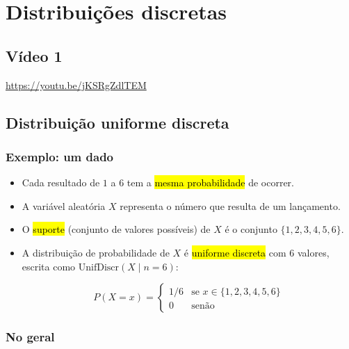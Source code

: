 \documentclass[
  11pt]{report}
\begin{document}
\hypertarget{discretas}{%
\chapter{Distribuições discretas}\label{discretas}}

\hypertarget{vuxeddeo-1-5}{%
\section{Vídeo 1}\label{vuxeddeo-1-5}}

\begin{center} \url{https://youtu.be/jKSRgZdlTEM} \end{center}

\hypertarget{distribuiuxe7uxe3o-uniforme-discreta}{%
\section{Distribuição uniforme discreta}\label{distribuiuxe7uxe3o-uniforme-discreta}}

\hypertarget{exemplo-um-dado}{%
\subsection{Exemplo: um dado}\label{exemplo-um-dado}}

\begin{itemize}
\item
  Cada resultado de $1$ a $6$ tem a {\hl{mesma probabilidade}} de ocorrer.
\item
  A variável aleatória $X$ representa o número que resulta de um lançamento.
\item
  O {\hl{suporte}} (conjunto de valores possíveis) de $X$ é o conjunto $\{ 1, 2, 3, 4, 5, 6 \}$.
\item
  A distribuição de probabilidade de $X$ é {\hl{uniforme discreta}} com $6$ valores, escrita como $\text{UnifDiscr}(X \mid n=6)$:

  \[
  P(X = x) = \begin{cases}
        1/6 &\text{se } x \in \{1, 2, 3, 4, 5, 6\} \\
        0   &\text{senão}
      \end{cases}
  \]
\end{itemize}

\hypertarget{no-geral-1}{%
\subsection{No geral}\label{no-geral-1}}
\end{document}
